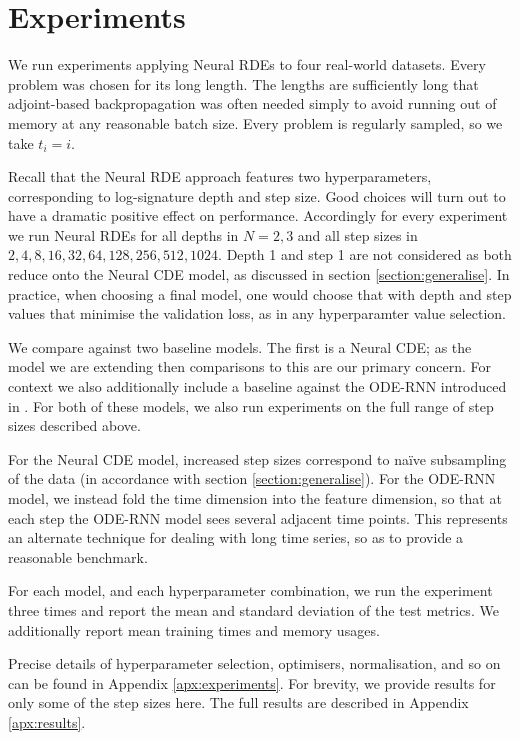 \documentclass{article}
\begin{document}
 
\section{Experiments} \label{sec:experiments}
We run experiments applying Neural RDEs to four real-world datasets. Every problem was chosen for its long length. The lengths are sufficiently long that adjoint-based backpropagation \citep{neural2018ode} was often needed simply to avoid running out of memory at any reasonable batch size. Every problem is regularly sampled, so we take $t_i = i$.

Recall that the Neural RDE approach features two hyperparameters, corresponding to log-signature depth and step size. Good choices will turn out to have a dramatic positive effect on performance. Accordingly for every experiment we run Neural RDEs for all depths in $N=2,3$ and all step sizes in $2,4,8,16,32,64,128,256,512,1024$. Depth 1 and step 1 are not considered as both reduce onto the Neural CDE model, as discussed in section \ref{section:generalise}. In practice, when choosing a final model, one would choose that with depth and step values that minimise the validation loss, as in any hyperparamter value selection.

We compare against two baseline models. The first is a Neural CDE; as the model we are extending then comparisons to this are our primary concern. For context we also additionally include a baseline against the ODE-RNN introduced in \citet{rubanova2019latent}. For both of these models, we also run experiments on the full range of step sizes described above.

For the Neural CDE model, increased step sizes correspond to na{\"i}ve subsampling of the data (in accordance with section \ref{section:generalise}). For the ODE-RNN model, we instead fold the time dimension into the feature dimension, so that at each step the ODE-RNN model sees several adjacent time points. This represents an alternate technique for dealing with long time series, so as to provide a reasonable benchmark.





For each model, and each hyperparameter combination, we run the experiment three times and report the mean and standard deviation of the test metrics. We additionally report mean training times and memory usages. 



Precise details of hyperparameter selection, optimisers, normalisation, and so on can be found in Appendix \ref{apx:experiments}. For brevity, we provide results for only some of the step sizes here. The full results are described in Appendix \ref{apx:results}.
\end{document}

